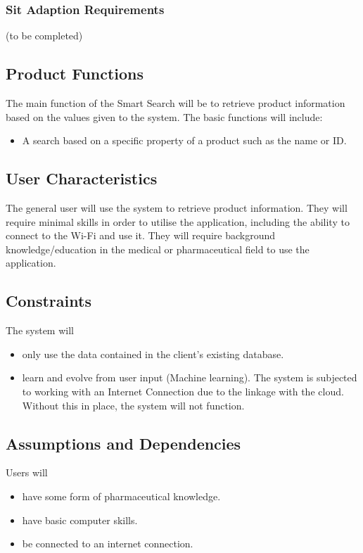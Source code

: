 \documentclass[a4paper,10pt]{article}
\begin{document}
           \subsubsection{Sit Adaption Requirements}
        (to be completed)

		\subsection{Product Functions} {The main function of the Smart Search will be to retrieve product information based on the values given to the system. The basic functions will include:  }
	\begin{itemize}
  		\item A search based on a specific property of a product such as the name or ID.
	\end{itemize}
	
    	\subsection{User Characteristics}  

{The general user will use the system to retrieve product information. They will require minimal skills in order to utilise the application, including the ability to connect to the Wi-Fi and use it. They will require background knowledge/education in the medical or pharmaceutical field to use the application.\\}

    	\subsection{Constraints}
	The system will
	\begin{itemize}
		\item only use the data contained in the client's existing database.
		\item learn and evolve from user input (Machine learning).
	The system is subjected to working with an Internet Connection due to the linkage with the cloud. Without this in place, the system will not function.	
		
	\end{itemize}
	
    	\subsection{Assumptions and Dependencies}
	Users will	
	\begin{itemize}
	 
		\item have some form of pharmaceutical knowledge.
		\item have basic computer skills.
		\item be connected to an internet connection.
	\end{itemize}
\end{document}
